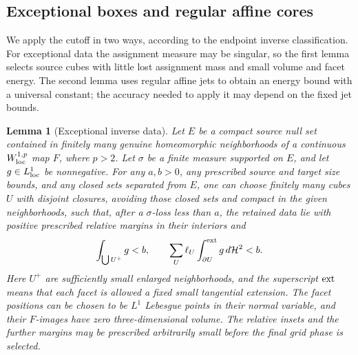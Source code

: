 \documentclass[11pt]{article}
\numberwithin{equation}{section}
\newtheorem{lemma}[theorem]{Lemma}
\theoremstyle{definition}
\theoremstyle{remark}
\newcommand{\cH}{\mathcal H}
\begin{document}
\subsection{Exceptional boxes and regular affine cores}

We apply the cutoff in two ways, according to the endpoint inverse
classification.  For exceptional data the assignment measure may be
singular, so the first lemma selects source cubes with little lost
assignment mass and small volume and facet energy.  The second lemma
uses regular affine jets to obtain an energy bound with a universal
constant; the accuracy needed to apply it may depend on the fixed jet
bounds.

\begin{lemma}[Exceptional inverse data]\label{hp:exceptional-boxes}
Let $E$ be a compact source null set contained in finitely many genuine
homeomorphic neighborhoods of a continuous $W^{1,p}_{\rm loc}$ map
$F$, where $p>2$.  Let $\sigma$ be a finite measure supported on $E$,
and let $g\in L^1_{\rm loc}$ be nonnegative.  For any $a,b>0$, any
prescribed source and target size bounds, and any closed sets separated
from $E$, one can choose finitely many cubes $U$ with disjoint closures,
avoiding those closed sets and compact in the given neighborhoods,
such that, after a $\sigma$-loss less than $a$, the retained data lie
with positive prescribed relative margins in their interiors and
\begin{equation}\label{hp:exceptional-cube-budget}
 \int_{\bigcup U^+}g< b,
 \qquad
 \sum_U\ell_U\int_{\partial U}^{\rm ext}g\,d\cH^2<b.
\end{equation}
Here $U^+$ are sufficiently small enlarged neighborhoods, and the
superscript $\rm ext$ means that each facet is allowed a fixed small
tangential extension.  The facet positions can be chosen to be
$L^1$ Lebesgue points in their normal variable, and their $F$-images
have zero three-dimensional volume.  The relative insets and the
further margins may be prescribed arbitrarily small before the final
grid phase is selected.
\end{lemma}
\end{document}
